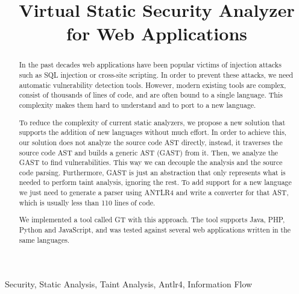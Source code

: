 \documentclass[conference]{IEEEtran}
\newcommand{\astname}{GAST}
\newcommand{\implangs}{Java, PHP, Python and JavaScript}
\begin{document}
\title{Virtual Static Security Analyzer for Web Applications}

\author{
\and
{}
\and
{}
}


\maketitle

\begin{abstract}
In the past decades web applications have been popular victims of injection attacks such as SQL injection or cross-site scripting. In order to prevent these attacks, we need automatic vulnerability detection tools. However, modern existing tools are complex, consist of thousands of lines of code, and are often bound to a single language. This complexity makes them hard to understand and to port to a new language. 


To reduce the complexity of current static analyzers, we propose a new solution that supports the addition of new languages without much effort. In order to achieve this, our solution does not analyze the source code AST directly, instead, it traverses the source code AST and builds a generic AST (\astname{}) from it. Then, we analyze the \astname{} to find vulnerabilities. This way we can decouple the analysis and the source code parsing. Furthermore, \astname{} is just an abstraction that only represents what is needed to perform taint analysis, ignoring the rest. To add support for a new language we just need to generate a parser using ANTLR4 \cite{antlr4book} and write a converter for that AST, which is usually less than 110 lines of code. 

We implemented a tool called GT with this approach. The tool supports \implangs{}, and was tested against several web applications written in the same languages.
\end{abstract}
\begin{IEEEkeywords}
Security, Static Analysis, Taint Analysis, Antlr4, Information Flow
\end{IEEEkeywords}


















\end{document}
